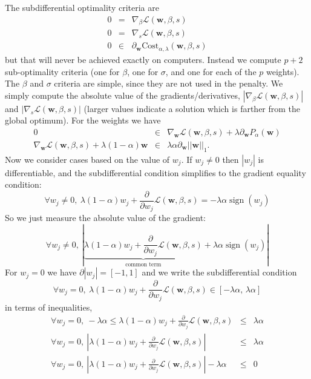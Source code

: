 \documentclass{article}
\DeclareMathOperator*{\sign}{sign}
\newcommand{\Cost}{\text{Cost}}
\begin{document}
The subdifferential optimality criteria are
\begin{eqnarray}
0 &=&  \nabla_\beta \mathcal L(\mathbf w, \beta, s)\\
0 &=&  \nabla_s \mathcal L(\mathbf w, \beta, s) \\
0 &\in&  \partial_{\mathbf w} \Cost_{\alpha,\lambda}(\mathbf w, \beta, s) 
\end{eqnarray}
but that will never be achieved exactly on computers. Instead we
compute $p+2$ sub-optimality criteria (one for $\beta$, one for
$\sigma$, and one for each of the $p$ weights). The $\beta$ and
$\sigma$ criteria are simple, since they are not used in the
penalty. We simply compute the absolute value of the
gradients/derivatives,
$|\nabla_\beta \mathcal L(\mathbf w, \beta, s)|$ and
$|\nabla_s \mathcal L(\mathbf w, \beta, s)|$ (larger values indicate a
solution which is farther from the global optimum). For the weights we
have
\begin{eqnarray}
  0 &\in& \nabla_{\mathbf w} \mathcal L(\mathbf w, \beta, s)
+ \lambda \partial_{\mathbf w} P_\alpha(\mathbf w) \\
  \nabla_{\mathbf w} \mathcal L(\mathbf w, \beta, s)
+ \lambda (1-\alpha)\mathbf w 
&\in& \lambda \alpha \partial_{\mathbf w} ||\mathbf w||_1.
\end{eqnarray}
Now we consider cases based on the value of $w_j$. If $w_j\neq 0$ then
$|w_j|$ is differentiable, and the subdifferential condition
simplifies to the gradient equality condition:
\begin{equation}
  \forall w_j\neq 0,\ 
  \lambda(1-\alpha)w_j +
  \frac{\partial}{\partial w_j} 
  \mathcal L(\mathbf w, \beta, s) = -\lambda\alpha\sign(w_j)
\end{equation}
So we just measure the absolute value of the gradient:
\begin{equation}
  \forall w_j\neq 0,\ 
  |
  \underbrace{\lambda(1-\alpha)w_j +
    \frac{\partial}{\partial w_j} 
  \mathcal L(\mathbf w, \beta, s)}_{\text{common term}}
+
  \lambda\alpha\sign(w_j)|
\end{equation}
For $w_j=0$ we have $\partial|w_j|=[-1,1]$ and we write the
subdifferential condition
\begin{equation}
  \forall w_j= 0,\ 
\lambda(1-\alpha)w_j +
    \frac{\partial}{\partial w_j} 
  \mathcal L(\mathbf w, \beta, s)
 \in [-\lambda \alpha ,\, \lambda\alpha]
\end{equation}
in terms
of inequalities,
\begin{eqnarray*}
  \forall w_j= 0,\ 
-\lambda\alpha  \leq
\lambda(1-\alpha)w_j +
    \frac{\partial}{\partial w_j} 
  \mathcal L(\mathbf w, \beta, s)
&\leq& \lambda\alpha\\
  \forall w_j= 0,\ 
|\lambda(1-\alpha)w_j +
    \frac{\partial}{\partial w_j} 
  \mathcal L(\mathbf w, \beta, s)|
&\leq& \lambda\alpha\\
  \forall w_j= 0,\ 
|\lambda(1-\alpha)w_j +
    \frac{\partial}{\partial w_j} 
  \mathcal L(\mathbf w, \beta, s)|
 -  \lambda\alpha
&\leq& 0\\
\end{eqnarray*}
\end{document}
